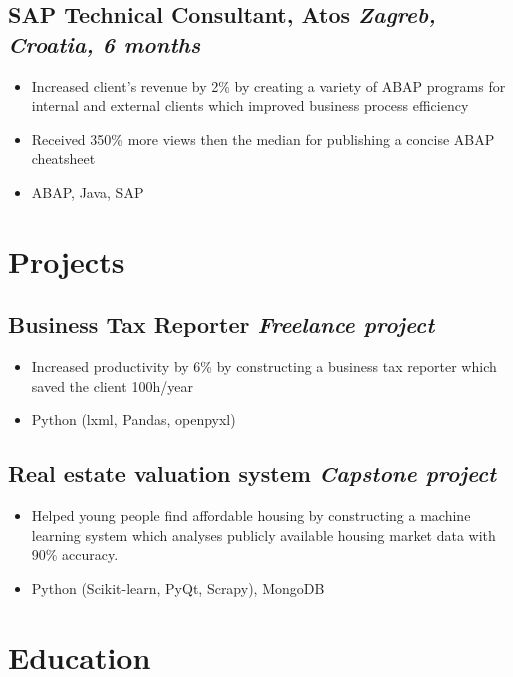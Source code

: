 \documentclass[a4paper]{article}
\newcommand{\bolditalicpair}
[2]
{\textbf{#1} \texorpdfstring{\hfill}{} \textit{#2}}
\begin{document}
\subsection{\bolditalicpair{SAP Technical Consultant, Atos}{Zagreb, Croatia, 6 months}}

\begin{itemize}
  \item Increased client's revenue by 2\% by creating a variety of ABAP programs for internal and external clients which improved business process efficiency
  \item Received 350\% more views then the median for publishing a concise ABAP cheatsheet
  \item ABAP, Java, SAP
\end{itemize}



\section{Projects}
\subsection{\bolditalicpair{Business Tax Reporter}{Freelance project}}

\begin{itemize}
  \item Increased productivity by 6\% by constructing a business tax reporter which saved the client 100h/year
  \item Python (lxml, Pandas, openpyxl)
\end{itemize}

\subsection{\bolditalicpair{Real estate valuation system}{Capstone project}}

\begin{itemize}
  \item Helped young people find affordable housing by constructing a machine learning system which analyses publicly available housing market data with 90\% accuracy.
  \item Python (Scikit-learn, PyQt, Scrapy), MongoDB
\end{itemize}



\section{Education}
\end{document}
